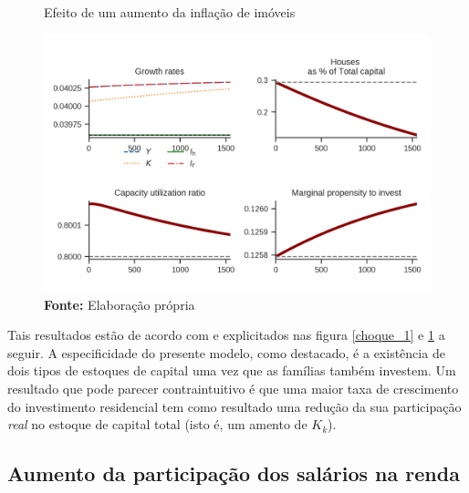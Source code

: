 \begin{figure}[H]
	\centering
	\caption{Efeito de um aumento da inflação de imóveis}
	\label{choque_4}
	\includegraphics{../../Modelo/Versoes/Shock_4.png}
	\caption*{\textbf{Fonte:} Elaboração própria}
\end{figure}



Tais resultados estão de acordo com \textcite{freitas_growth_2015} e explicitados nas figura \ref{choque_1} e \ref{choque_4} a seguir. A especificidade do presente modelo, como destacado, é a existência de dois tipos de estoques de capital uma vez que as famílias também investem. Um resultado que pode parecer contraintuitivo é que uma maior taxa de crescimento do investimento residencial tem como resultado uma redução  da sua participação \textit{real} no estoque de capital total (isto é, um amento de $K_k$). 

\subsection*{Aumento da participação dos salários na renda}

